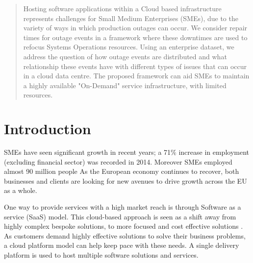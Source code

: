 \documentclass[conference]{IEEEtran}
\begin{document}
\begin{abstract}

Hosting software applications within a Cloud based infrastructure represents challenges for Small Medium Enterprises (SMEs), due to the variety of ways in which production outages can occur. We consider repair times for outage events in a framework where these downtimes are used to refocus Systems Operations resources. Using an enterprise dataset, we address the question of how outage events are distributed and what relationship these events have with different types of issues that can occur in a cloud data centre. The proposed framework can aid SMEs to maintain a highly available "On-Demand" service infrastructure, with limited resources.
\end{abstract}


%
\IEEEpeerreviewmaketitle

\section{Introduction}

SMEs have seen significant growth in recent years; a 71\% increase in employment (excluding financial sector) was recorded in 2014. Moreover SMEs employed almost 90 million people \cite{europa2015sme} As the European economy continues to recover, both businesses and clients are looking for new avenues to drive growth across the EU as a whole. \par

One way to provide services with a high market reach is through Software as a service (SaaS) model. This cloud-based approach is seen as a shift away from highly complex bespoke solutions, to more focused and cost effective solutions \cite{cloudbook2015}. As customers demand highly effective solutions to solve their business problems, a cloud platform model can help keep pace with these needs. A single delivery platform is used to host multiple software solutions and services. \par
\end{document}

